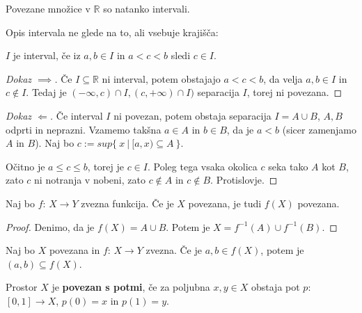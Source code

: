 \documentclass[11pt, a4paper]{article}
\begin{document}
    \begin{theorem}
        Povezane množice v \(\mathbb{R}\) so natanko intervali.
    \end{theorem}

    Opis intervala ne glede na to, ali vsebuje krajišča:
    \par
    \(I\) je interval, če iz \(a,b \in I\) in \(a < c < b\) sledi \(c \in I\).
    \begin{proof}[Dokaz \(\implies\)]
        Če \(I \subseteq \mathbb{R}\) ni interval, potem obstajajo \(a < c < b\), da velja \(a,b \in I\) in \(c \notin I\). Tedaj je \((- \infty, c) \cap I, (c, + \infty) \cap I)\) separacija \(I\), torej ni povezana. 
    \end{proof}

    \begin{proof}[Dokaz \(\Longleftarrow\)]
        Če interval \(I\) ni povezan, potem obstaja separacija \(I = A \cup B\), \(A,B\) odprti in neprazni. Vzamemo takšna \(a \in A\) in \(b \in B\), da je \(a < b\) (sicer zamenjamo \(A\) in \(B\)). Naj bo \(c := sup\{\ x\ |\ [a,x) \subseteq A\ \}\).
        \par
        Očitno je \(a \le c \le b\), torej je \(c \in I\). Poleg tega vsaka okolica \(c\) seka tako \(A\) kot \(B\), zato \(c\) ni notranja v nobeni, zato \(c \notin A\) in \(c \notin B\). Protislovje.
    \end{proof}

    
    \begin{theorem}
        Naj bo \(f\): \(X \to Y\) zvezna funkcija. Če je \(X\) povezana, je tudi \(f(X)\) povezana.
    \end{theorem}

    \begin{proof}
        Denimo, da je \(f(X) = A \cup B\). Potem je \(X = f^{-1}(A) \cup f^{-1}(B)\).
    \end{proof}

    \begin{corollary}
        Naj bo \(X\) povezana in \(f\): \(X \to Y\) zvezna. Če je \(a,b \in f(X)\), potem je \((a,b) \subseteq f(X)\).
    \end{corollary}


    \begin{definition}
        Prostor \(X\) je \textbf{povezan s potmi}, če za poljubna \(x,y \in X\) obstaja pot \(p\): \([0,1] \to X\), \(p(0) = x\) in \(p(1) = y\).
    \end{definition}
\end{document}
